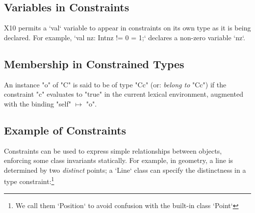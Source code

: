 \subsection{Variables in Constraints}

X10 permits a \xcd`val` variable to appear in constraints on its own type as
it is being declared.  For example, \xcd`val nz: Int{nz != 0} = 1;` declares a
non-zero variable \xcd`nz`.




\subsection{Membership in Constrained Types}

An instance \xcd"o" of \xcd"C" is said to be of type \xcd"C{c}" (or: {\em
belong to} \xcd"C{c}") if the constraint \xcd"c" evaluates to \xcd"true" in
the current lexical environment, augmented with the binding \xcd"self"
$\mapsto$ \xcd"o".



\subsection{Example of Constraints}



Constraints can be used to express simple relationships between objects,
enforcing some class invariants statically.  For example, in geometry, a line
is determined by two {\em distinct} points; a \xcd`Line` class can specify the
distinctness in a type constraint:\footnote{We call them
\xcd`Position` to avoid confusion with the built-in class \xcd`Point`}


